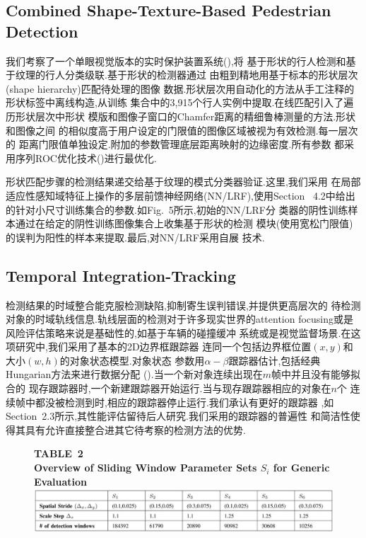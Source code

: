 \documentclass[10pt,letterpaper,journal,compsoc]{IEEEtran}
\begin{document}
\subsection{Combined Shape-Texture-Based Pedestrian Detection}
我们考察了一个单眼视觉版本的实时保护装置系统(\cite{bib23}),将
基于形状的行人检测和基于纹理的行人分类级联.基于形状的检测器通过
由粗到精地用基于标本的形状层次(shape hierarchy)匹配待处理的图像
数据.形状层次用自动化的方法从手工注释的形状标签中离线构造,从训练
集合中的3,915个行人实例中提取.在线匹配引入了遍历形状层次中形状
模版和图像子窗口的Chamfer距离的精细鲁棒测量的方法.形状和图像之间
的相似度高于用户设定的门限值的图像区域被视为有效检测.每一层次的
距离门限值单独设定.附加的参数管理底层距离映射的边缘密度.所有参数
都采用序列ROC优化技术(\cite{bib23})进行最优化.

形状匹配步骤的检测结果递交给基于纹理的模式分类器验证.这里,我们采用
在局部适应性感知域特征上操作的多层前馈神经网络(NN/LRF),使用Section
~4.2中给出的针对小尺寸训练集合的参数.如Fig.~5所示,初始的NN/LRF分
类器的阴性训练样本通过在给定的阴性训练图像集合上收集基于形状的检测
模块(使用宽松门限值)的误判为阳性的样本来提取.最后,对NN/LRF采用自展
技术.


\subsection{Temporal Integration-Tracking}
检测结果的时域整合能克服检测缺陷,抑制寄生误判错误,并提供更高层次的
待检测对象的时域轨线信息.轨线层面的检测对于许多现实世界的attention
focusing或是风险评估策略来说是基础性的,如基于车辆的碰撞缓冲
系统或是视觉监督场景.在这项研究中,我们采用了基本的2D边界框跟踪器
连同一个包括边界框位置$(x,y)$和大小$(w,h)$的对象状态模型.对象状态
参数用$\alpha-\beta$跟踪器估计,包括经典Hungarian方法来进行数据分配
(\cite{bib37}).当一个新对象连续出现在$m$帧中并且没有能够拟合的
现存跟踪器时,一个新建跟踪器开始运行.当与现存跟踪器相应的对象在$n$个
连续帧中都没被检测到时,相应的跟踪器停止运行.我们承认有更好的跟踪器
,如Section~2.3所示,其性能评估留待后人研究.我们采用的跟踪器的普遍性
和简洁性使得其具有允许直接整合进其它待考察的检测方法的优势.
\begin{figure}[!b]
\centering
\large{\textbf{TABLE~2\\
Overview of Sliding Window Parameter Sets $S_i$ for Generic Evaluation
}}
\includegraphics[width=7in]{table2.JPG}
\end{figure}
\end{document}
